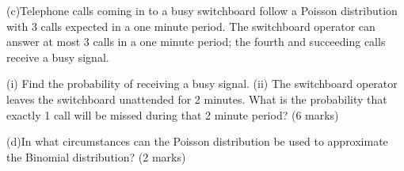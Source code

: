 
(c)Telephone calls coming in to a busy switchboard follow a Poisson distribution with 3 calls expected in a one minute period.  
The switchboard operator can answer at most 3 calls in a one minute period; the fourth and succeeding calls receive a busy signal.

(i)   Find the probability of receiving a busy signal.
(ii)   The switchboard operator leaves the switchboard unattended for 2 minutes.  What is the probability that exactly 1 call will be missed during that 2 minute period?
(6 marks)

(d)In what circumstances can the Poisson distribution be used to approximate the Binomial distribution?
(2 marks)


